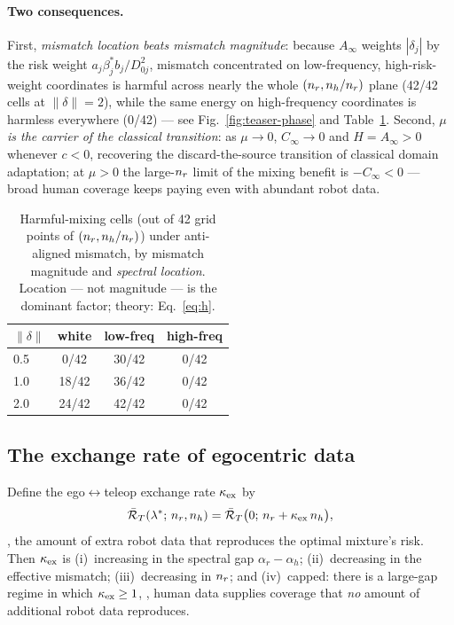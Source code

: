 \paragraph{Two consequences.}
First, \emph{mismatch location beats mismatch magnitude}: because $A_\infty$ weights $|\delta_j|$ by the risk weight $a_j\beta^*_j b_j/D_{0j}^2$, mismatch concentrated on low-frequency, high-risk-weight coordinates is harmful across nearly the whole $(n_r, n_h/n_r)$ plane (42/42 cells at $\|\delta\|=2$), while the same energy on high-frequency coordinates is harmless everywhere (0/42) --- see Fig.~\ref{fig:teaser-phase} and Table~\ref{tab:harmful}.
Second, \emph{$\mu$ is the carrier of the classical transition}: as $\mu \to 0$, $C_\infty \to 0$ and $H = A_\infty > 0$ whenever $c<0$, recovering the discard-the-source transition of classical domain adaptation; at $\mu > 0$ the large-$n_r$ limit of the mixing benefit is $-C_\infty < 0$ --- broad human coverage keeps paying even with abundant robot data.

\begin{table}[t]
  \centering
  \small
  \caption{Harmful-mixing cells (out of 42 grid points of $(n_r, n_h/n_r)$) under anti-aligned mismatch, by mismatch magnitude and \emph{spectral location}.
  Location --- not magnitude --- is the dominant factor; theory: Eq.~\eqref{eq:h}.}
  \label{tab:harmful}
  \begin{tabular}{lccc}
    \toprule
    $\|\delta\|$ & white & low-freq & high-freq \\
    \midrule
    0.5 & 0/42 & 30/42 & 0/42 \\
    1.0 & 18/42 & 36/42 & 0/42 \\
    2.0 & 24/42 & 42/42 & 0/42 \\
    \bottomrule
  \end{tabular}
\end{table}

\subsection{The exchange rate of egocentric data}

\begin{corollary}\label{cor:kex}
Define the ego$\leftrightarrow$teleop exchange rate $\kappa_{\mathrm{ex}}$ by
\begin{equation}
  \bar{\mathcal{R}}_T(\lambda^*;\, n_r, n_h) = \bar{\mathcal{R}}_T\big(0;\, n_r + \kappa_{\mathrm{ex}}\, n_h\big),
  \label{eq:kex}
\end{equation}
\ie, the amount of extra robot data that reproduces the optimal mixture's risk.
Then $\kappa_{\mathrm{ex}}$ is (i)~increasing in the spectral gap $\alpha_r - \alpha_h$; (ii)~decreasing in the effective mismatch; (iii)~decreasing in $n_r$; and (iv)~capped: there is a large-gap regime in which $\kappa_{\mathrm{ex}} \ge 1$, \ie, human data supplies coverage that \emph{no} amount of additional robot data reproduces.
\end{corollary}

